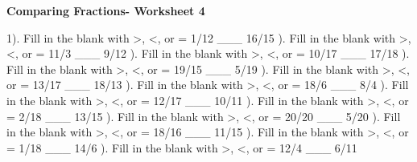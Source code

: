 \documentclass{article}%
\begin{document}
\newline%
\pagebreak%
\large%
\begin{center}%
\textbf{Comparing Fractions- Worksheet 4}%
\newline%
\end{center} \normalsize%
1). Fill in the blank with >, <, or = 1/12 \_\_\_ 16/15%
\newline%
\newline%
). Fill in the blank with >, <, or = 11/3 \_\_\_ 9/12%
\newline%
\newline%
). Fill in the blank with >, <, or = 10/17 \_\_\_ 17/18%
\newline%
\newline%
). Fill in the blank with >, <, or = 19/15 \_\_\_ 5/19%
\newline%
\newline%
). Fill in the blank with >, <, or = 13/17 \_\_\_ 18/13%
\newline%
\newline%
). Fill in the blank with >, <, or = 18/6 \_\_\_ 8/4%
\newline%
\newline%
). Fill in the blank with >, <, or = 12/17 \_\_\_ 10/11%
\newline%
\newline%
). Fill in the blank with >, <, or = 2/18 \_\_\_ 13/15%
\newline%
\newline%
). Fill in the blank with >, <, or = 20/20 \_\_\_ 5/20%
\newline%
\newline%
). Fill in the blank with >, <, or = 18/16 \_\_\_ 11/15%
\newline%
\newline%
). Fill in the blank with >, <, or = 1/18 \_\_\_ 14/6%
\newline%
\newline%
). Fill in the blank with >, <, or = 12/4 \_\_\_ 6/11%
\end{document}
